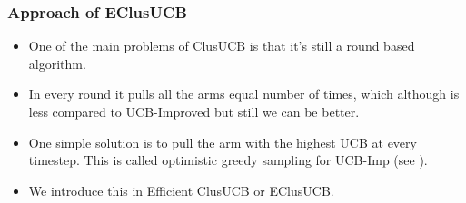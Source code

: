 \begin{frame}
\frametitle{Approach of EClusUCB}
\begin{itemize}
\item<1-> One of the main problems of ClusUCB is that it's still a round based algorithm.
\item<2-> In every round it pulls all the arms equal number of times, which although is less compared to UCB-Improved but still we can be better.
\item<3-> One simple solution is to pull the arm with the highest UCB at every timestep. This is called optimistic greedy sampling for UCB-Imp (see \cite{liu2016modification}).
\item<4-> We introduce this in Efficient ClusUCB or EClusUCB.
\end{itemize}
\end{frame}

